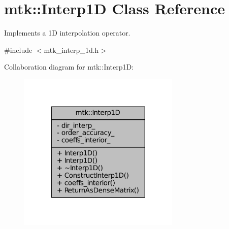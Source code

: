 \hypertarget{classmtk_1_1Interp1D}{\section{mtk\-:\-:Interp1\-D Class Reference}
\label{classmtk_1_1Interp1D}
}


Implements a 1\-D interpolation operator.  




{\ttfamily \#include $<$mtk\-\_\-interp\-\_\-1d.\-h$>$}



Collaboration diagram for mtk\-:\-:Interp1\-D\-:
\nopagebreak
\begin{figure}[H]
\begin{center}
\leavevmode
\includegraphics[width=218pt]{classmtk_1_1Interp1D__coll__graph}
\end{center}
\end{figure}
